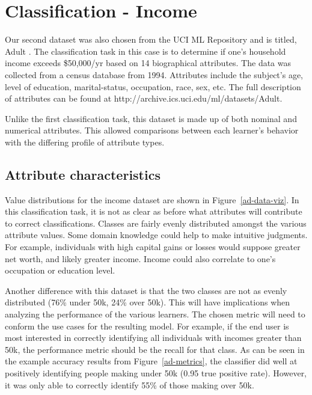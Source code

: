 \documentclass{sig-alternate}
\begin{document}
\section{Classification - Income}

Our second dataset was also chosen from the UCI ML Repository and is titled, Adult \cite{Bache+Lichman:2013}. The classification task in this case is to determine if one's household income exceeds \$50,000/yr based on 14 biographical attributes. The data was collected from a census database from 1994. Attributes include the subject's age, level of education, marital-status, occupation, race, sex, etc. The full description of attributes can be found at http://archive.ics.uci.edu/ml/datasets/Adult.

Unlike the first classification task, this dataset is made up of both nominal and numerical attributes. This allowed comparisons between each learner's behavior with the differing profile of attribute types.

\subsection{Attribute characteristics}

Value distributions for the income dataset are shown in Figure~\ref{ad-data-viz}. In this classification task, it is not as clear as before what attributes will contribute to correct classifications. Classes are fairly evenly distributed amongst the various attribute values. Some domain knowledge could help to make intuitive judgments. For example, individuals with high capital gains or losses would suppose greater net worth, and likely greater income. Income could also correlate to one's occupation or education level.

Another difference with this dataset is that the two classes are not as evenly distributed (76\% under 50k, 24\% over 50k). This will have implications when analyzing the performance of the various learners. The chosen metric will need to conform the use cases for the resulting model. For example, if the end user is most interested in correctly identifying all individuals with incomes greater than 50k, the performance metric should be the recall for that class. As can be seen in the example accuracy results from Figure~\ref{ad-metrics}, the classifier did well at positively identifying people making under 50k (0.95 true positive rate). However, it was only able to correctly identify 55\% of those making over 50k.
\end{document}
